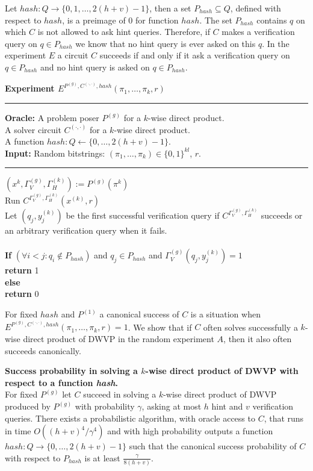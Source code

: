 
Let $hash:Q\rightarrow\{0,1,\dots, 2(h+v)-1\}$, then a set $P_{hash} \subseteq Q$,
defined with respect to $hash$, is a preimage of $0$ for function $hash$.
The set $P_{hash}$ contains $q$ on which $C$ is not allowed to ask hint queries.
Therefore, if $C$ makes a verification query on $q \in P_{hash}$ we know that no hint query is ever asked on this $q$.
In the experiment $E$ a circuit $C$ succeeds if and only if it ask a verification query on $q \in P_{hash}$ and no hint query is asked on $q \in P_{hash}$.
%
\begin{codeblock}
  \textbf{Experiment $E^{P^{(g)}, C^{(\cdot, \cdot)}, hash}(\pi_1, \dots, \pi_k, r)$}
  \medskip

  \hrule

  \medskip
  \textbf{Oracle:} A problem poser $P^{(g)}$ for a $k$-wise direct product. \\
  \IndI A solver circuit $C^{(\cdot, \cdot)}$ for a $k$-wise direct product. \\
  \IndI A function $hash: Q \leftarrow \{0, \dots, 2(h+v) - 1\}$.\\
  \textbf{Input:} Random bitstrings: $(\pi_1, \dots, \pi_k) \in \{0,1\}^{kl}$, $r$.
  \medskip\hrule\medskip
  $(x^{k}, \Gamma_V^{(g)}, \Gamma_H^{(k)}) := P^{(g)}(\pi^{k})$\\
  Run $C^{\Gamma_V^{(g)}, \Gamma_H^{(k)}} (x^{(k)}, r)$ \\
  \IndI Let $(q_j,y_j^{(k)})$ be the first successful verification query if $C^{\Gamma_V^{(g)}, \Gamma_H^{(k)}}$ succeeds or \\
  \IndI an arbitrary verification query when it fails.\\
  \\
  \textbf{If} $(\forall i < j :  q_i \notin P_{hash} )$ and $q_j \in P_{hash}$ and $\Gamma_V^{(g)}(q_j, y_j^{(k)}) = 1$ \\
  \IndI \textbf{return} 1\\
  \textbf{else}\\
  \IndI \textbf{return} 0
\end{codeblock}
%
For fixed $hash$ and $P^{(1)}$ a canonical success of $C$ is a situation when $E^{P^{(g)}, C^{(\cdot, \cdot)}, hash}(\pi_1, \dots, \pi_k, r) = 1$.
We show that if $C$ often solves successfully a $k$-wise direct product of DWVP in the random experiment $A$, then it also often succeeds canonically.
%
\begin{lemma}
\label{lemma:hash_function_probability}
\textbf{Success probability in solving a $k$-wise direct product of DWVP with respect to a function \textit{hash}.} \\
For fixed $P^{(g)}$ let $C$ succeed in solving a $k$-wise direct product of DWVP produced by $P^{(g)}$
with probability $\gamma$, asking at most $h$ hint and $v$ verification queries.
There exists a probabilistic algorithm, with oracle access to $C$, that runs in time $O((h+v)^4/\gamma^4)$
and with high probability outputs a function $hash: Q \rightarrow \{0, \dots, 2(h+v)-1\}$ such that the canonical success probability of
$C$ with respect to $P_{hash}$ is at least $\frac{\gamma}{8(h+v)}$.
\end{lemma}
